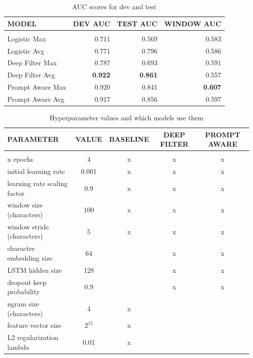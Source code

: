 \documentclass{article} %
\begin{document}
\begin{table}[t]
\caption{AUC scores for dev and test}
\label{results-table}
\begin{center}
\begin{tabular}{l r r r}
\multicolumn{1}{l}{\bf MODEL} &\multicolumn{1}{r}{\bf DEV AUC} &\multicolumn{1}{r}{\bf TEST AUC} &\multicolumn{1}{r}{\bf WINDOW AUC}
\\ \hline \\
Logistic Max & 0.711 & 0.569 & 0.583\\
Logistic Avg & 0.771 & 0.796& 0.586\\
Deep Filter Max & 0.787 & 0.693 & 0.591\\
Deep Filter Avg & \textbf{0.922} & \textbf{0.861}  & 0.557\\
Prompt Aware Max & 0.920 & 0.841 & \textbf{0.607}\\
Prompt Aware Avg & 0.917 & 0.856 & 0.597\\
\end{tabular}
\end{center}
\end{table}

\begin{table}[t]
\caption{Hyperparameter values and which models use them}
\label{param-table}
\begin{center}
\begin{tabular}{l c c c c}
\multicolumn{1}{l}{\bf PARAMETER} &\multicolumn{1}{c}{\bf VALUE} &\multicolumn{1}{c}{\bf BASELINE} &\multicolumn{1}{c}{\bf DEEP FILTER} &\multicolumn{1}{c}{\bf PROMPT AWARE}
\\ \hline \\
n epochs & 4 & x & x & x\\
initial learning rate & 0.001 & x & x & x\\
learning rate scaling factor & 0.9 & x & x & x\\
window size (characters) & 100 & x & x & x\\
window stride (characters) & 5 & x & x & x\\
character embedding size & 64 & & x & x\\
LSTM hidden size & 128 & & x & x\\
dropout keep probability & 0.9 & & x & x\\
ngram size (characters) & 4 & x & & \\
feature vector size & $2^{15}$ & x & & \\
L2 regularization lambda & 0.01 & x & & \\
\end{tabular}
\end{center}
\end{table}
\end{document}
